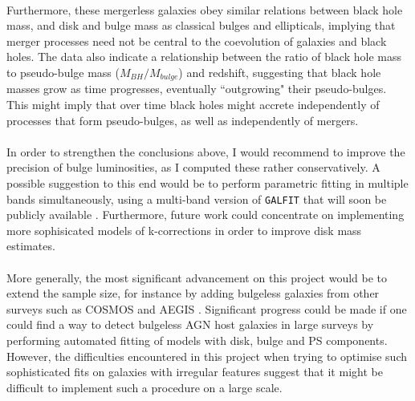 \documentclass[11pt,twocolumn]{article}
\begin{document}
\paragraph{}  Furthermore, these mergerless galaxies obey similar relations between black hole mass, and disk and bulge mass as classical bulges and ellipticals, implying that merger processes need not be central to the coevolution of galaxies and black holes. The data also indicate a relationship between the ratio of black hole mass to pseudo-bulge mass ($M_{BH}/M_{bulge}$) and redshift, suggesting that black hole masses grow as time progresses, eventually ``outgrowing" their pseudo-bulges. This might imply that over time black holes might accrete independently of processes that form pseudo-bulges, as well as independently of mergers. 

\paragraph{} In order to strengthen the conclusions above, I would recommend to improve the precision of bulge luminosities, as I computed these rather conservatively. A possible suggestion to this end would be to perform parametric fitting in multiple bands simultaneously, using a multi-band version of {\tt GALFIT} that will soon be publicly available \cite{2013MNRAS.430..330H}. Furthermore, future work could concentrate on implementing more  sophisicated models of k-corrections in order to improve disk mass estimates. 
\paragraph{} More generally, the most significant advancement on this project would be to extend the sample size, for instance by adding bulgeless galaxies from other surveys such as COSMOS \cite{2007ApJS..172....1S} and AEGIS \cite{2007ApJ...660L...1D}. Significant progress could be made if one could find a way to detect bulgeless AGN host galaxies in large surveys by performing automated fitting of models with disk, bulge and PS components. However, the difficulties encountered in this project when trying  to optimise such sophisticated fits on galaxies with irregular features suggest that it might be difficult to implement such a procedure on a large scale. 
\end{document}
